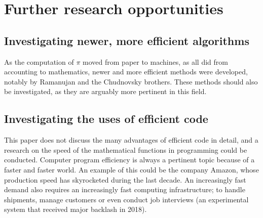 \section{Further research opportunities}

\subsection{Investigating newer, more efficient algorithms}

As the computation of $\pi$ moved from paper to machines, as all did from accounting to mathematics, newer and more efficient methods were developed, notably by Ramanujan and the Chudnovsky brothers. These methods should also be investigated, as they are arguably more pertinent in this field. 

\subsection{Investigating the uses of efficient code}

This paper does not discuss the many advantages of efficient code in detail, and a research on the speed of the mathematical functions in programming could be conducted. Computer program efficiency is always a pertinent topic because of a faster and faster world. An example of this could be the company Amazon, whose production speed has skyrocketed during the last decade. An increasingly fast demand also requires an increasingly fast computing infrastructure; to handle shipments, manage customers or even conduct job interviews (an experimental system that received major backlash in 2018). \cite{murad_2021}